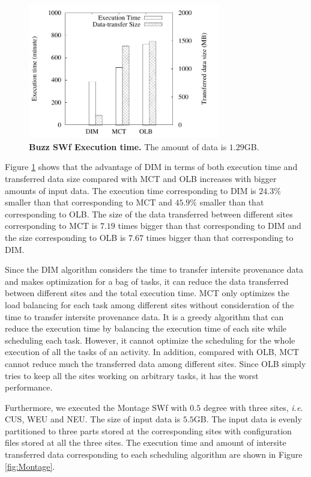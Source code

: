 \begin{figure}
\begin{centering}
\captionsetup{justification=centering}
\includegraphics[width=84mm]{figures/execTime}
\par\end{centering}
\caption{\textbf{Buzz SWf Execution time.} The amount of data is $1.29$GB.}
\label{fig:ET}
\end{figure}

Figure \ref{fig:ET} shows that the advantage of DIM in terms of both execution time and transferred data size compared with MCT and OLB increases with bigger amounts of input data. The execution time corresponding to DIM is $24.3\%$ smaller than that corresponding to MCT and $45.9\%$ smaller than that corresponding to OLB. The size of the data transferred between different sites corresponding to MCT is $7.19$ times bigger than that corresponding to DIM and the size corresponding to OLB is $7.67$ times bigger than that corresponding to DIM. 

Since the DIM algorithm considers the time to transfer intersite provenance data and makes optimization for a bag of tasks, it can reduce the data transferred between different sites and the total execution time. MCT only optimizes the load balancing for each task among different sites without consideration of the time to transfer intersite provenance data. It is a greedy algorithm that can reduce the execution time by balancing the execution time of each site while scheduling each task. However, it cannot optimize the scheduling for the whole execution of all the tasks of an activity. In addition, compared with OLB, MCT cannot reduce much the transferred data among different sites. Since OLB simply tries to keep all the sites working on arbitrary tasks, it has the worst performance.

Furthermore, we executed the Montage SWf with $0.5$ degree with three sites, \textit{i.e.} CUS, WEU and NEU. The size of input data is $5.5$GB. The input data is evenly partitioned to three parts stored at the corresponding sites with configuration files stored at all the three sites. The execution time and amount of intersite transferred data corresponding to each scheduling algorithm are shown in Figure \ref{fig:Montage}. 

